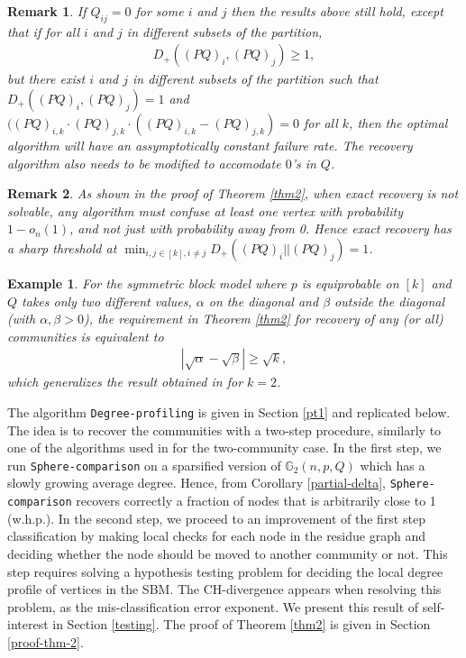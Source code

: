 \documentclass[11pt]{article}
\newcommand{\gs}{\mathbb{G}_2}
\newcommand{\dd}{D_+}
\newcommand{\1}{\mathbb{1}}
\newtheorem{remark}{Remark}
\newtheorem{example}{Example}
\begin{document}
\begin{remark}\label{qzero}
If $Q_{ij}=0$ for some $i$ and $j$ then the results above still hold, except that if for all $i$ and $j$ in different subsets of the partition,
\begin{align}
\dd ((PQ)_i , (PQ)_j) \geq 1, \label{d1}
\end{align}
but there exist $i$ and $j$  in different subsets of the partition such that $\dd ((PQ)_i , (PQ)_j) = 1$ and $((PQ)_{i,k}\cdot (PQ)_{j,k}\cdot ((PQ)_{i,k}-(PQ)_{j,k})=0$ for all $k$, then the optimal algorithm will have an assymptotically constant failure rate. The recovery algorithm also needs to be modified to accomodate $0$'s in $Q$.
\end{remark}

\begin{remark}
As shown in the proof of Theorem \ref{thm2}, when exact recovery is not solvable, any algorithm must confuse at least one vertex with probability $1-o_n(1)$, and not just with probability away from 0. Hence exact recovery has a sharp threshold at $\min_{i,j \in [k], i \neq j} \dd ((PQ)_i || (PQ)_j) = 1$.
\end{remark}

\begin{example}
For the symmetric block model where $p$ is equiprobable on $[k]$ and $Q$ takes only two different values, $\alpha$ on the diagonal and $\beta$ outside the diagonal (with $\alpha,\beta>0$), the requirement in Theorem \ref{thm2} for recovery of any (or all) communities is equivalent to  
\begin{align}
|\sqrt{\alpha} - \sqrt{\beta}| \geq \sqrt{k},
\end{align}
which generalizes the result obtained in \cite{abh,mossel-consist} for $k=2$.  
\end{example}


The algorithm {\tt Degree-profiling} is given in Section \ref{pt1} and replicated below. The idea is to recover the communities with a two-step procedure, similarly to one of the algorithms used in \cite{abh} for the two-community case. In the first step, we run {\tt Sphere-comparison} on a sparsified version of $\gs(n,p,Q)$ which has a slowly growing average degree. Hence, from Corollary \ref{partial-delta}, {\tt Sphere-comparison} recovers correctly a fraction of nodes that is arbitrarily close to 1 (w.h.p.). In the second step, we proceed to an improvement of the first step classification by making local checks for each node in the residue graph and deciding whether the node should be moved to another community or not. This step requires solving a hypothesis testing problem for deciding the local degree profile of vertices in the SBM. The CH-divergence appears when resolving this problem, as the mis-classification error exponent. We present this result of self-interest in Section \ref{testing}. The proof of Theorem \ref{thm2} is given in Section \ref{proof-thm-2}. \\
\end{document}
